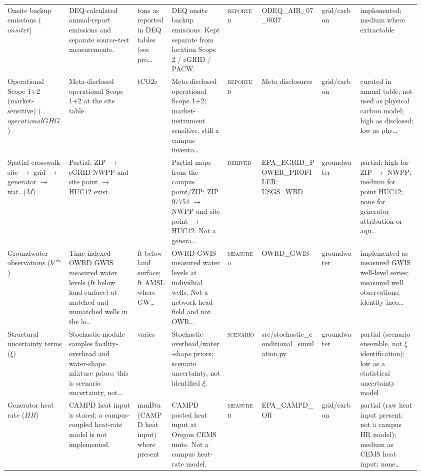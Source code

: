 \documentclass[11pt]{article}
\newcommand{\Reported}{\textsc{reported}}
\newcommand{\Measured}{\textsc{measured}}
\newcommand{\Derived}{\textsc{derived}}
\newcommand{\Scenario}{\textsc{scenario}}
\begin{document}
\begin{longtable}{@{}p{0.14\linewidth}p{0.16\linewidth}p{0.08\linewidth}p{0.13\linewidth}p{0.08\linewidth}p{0.14\linewidth}p{0.09\linewidth}p{0.14\linewidth}@{}}
Onsite backup emissions ($onsite t$) & DEQ-calculated annual-report emissions and separate source-test measurements. & tons as reported in DEQ tables (see pro\ldots & DEQ onsite backup emissions. Kept separate from location Scope 2 / eGRID / PACW. & \Reported{} & ODEQ\_AIR\_07\_0037 & grid/carbon & implemented; medium where extractable\\
Operational Scope 1+2 (market-sensitive) ($operational GHG$) & Meta-disclosed operational Scope 1+2 at the site table. & tCO2e & Meta-disclosed operational Scope 1+2; market-instrument sensitive, still a campus invento\ldots & \Reported{} & Meta disclosures & grid/carbon & curated in annual table; not used as physical carbon model; high as disclosed; low as phy\ldots\\
Spatial crosswalk site $\to$ grid $\to$ generator $\to$ wat\ldots ($M$) & Partial: ZIP $\to$ eGRID NWPP and site point $\to$ HUC12 exist. &  & Partial maps from the campus point/ZIP: ZIP 97754 $\to$ NWPP and site point $\to$ HUC12. Not a genera\ldots & \Derived{} & EPA\_EGRID\_POWER\_PROFILER; USGS\_WBD & groundwater & partial; high for ZIP $\to$ NWPP; medium for point HUC12; none for generator attribution or aqu\ldots\\
Groundwater observations ($h^{obs}$) & Time-indexed OWRD GWIS measured water levels (ft below land surface) at matched and unmatched wells in the lo\ldots & ft below land surface; ft AMSL where GW\ldots & OWRD GWIS measured water levels at individual wells. Not a network head field and not OWR\ldots & \Measured{} & OWRD\_GWIS & groundwater & implemented as measured GWIS well-level series; measured well observations; identity inco\ldots\\
Structural uncertainty terms ($\xi$) & Stochastic module samples facility-overhead and water-shape mixture priors; this is scenario uncertainty, not\ldots & varies & Stochastic overhead/water-shape priors; scenario uncertainty, not identified $\xi$. & \Scenario{} & src/stochastic\_conditional\_simulation.py & groundwater & partial (scenario ensemble, not $\xi$ identification); low as a statistical uncertainty model\\
Generator heat rate ($HR$) & CAMPD heat input is stored; a campus-coupled heat-rate model is not implemented. & mmBtu (CAMPD heat input) where present & CAMPD posted heat input at Oregon CEMS units. Not a campus heat-rate model. & \Measured{} & EPA\_CAMPD\_OR & grid/carbon & partial (raw heat input present; not a campus HR model); medium as CEMS heat input; none\ldots\\
\end{longtable}
\endgroup
\end{document}
